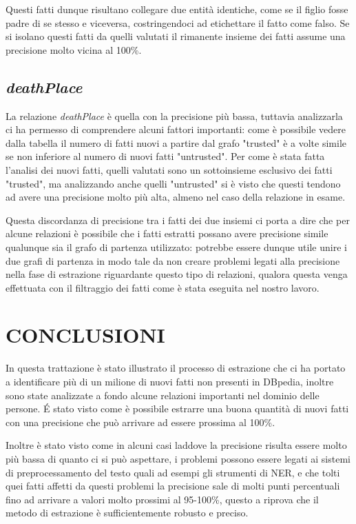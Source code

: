 \documentclass[10pt,a4paper,twocolumn]{article}
\begin{document}
Questi fatti dunque risultano collegare due entità identiche, come se il figlio fosse padre di se stesso e viceversa, costringendoci ad etichettare il fatto come falso. Se si isolano questi fatti da quelli valutati il rimanente insieme dei fatti assume una precisione molto vicina al 100\%.

\subsection{\textit{deathPlace}} \label{deathPlace}

La relazione \textit{deathPlace} è quella con la precisione più bassa, tuttavia analizzarla ci ha permesso di comprendere alcuni fattori importanti: come è possibile vedere dalla tabella il numero di fatti nuovi a partire dal grafo "trusted" è a volte simile se non inferiore al numero di nuovi fatti "untrusted". Per come è stata fatta l'analisi dei nuovi fatti, quelli valutati sono un sottoinsieme esclusivo dei fatti "trusted", ma analizzando anche quelli "untrusted" si è visto che questi tendono ad avere una precisione molto più alta, almeno nel caso della relazione in esame.

Questa discordanza di precisione tra i fatti dei due insiemi ci porta a dire che per alcune relazioni è possibile che i fatti estratti possano avere precisione simile qualunque sia il grafo di partenza utilizzato: potrebbe essere dunque utile unire i due grafi di partenza in modo tale da non creare problemi legati alla precisione nella fase di estrazione riguardante questo tipo di relazioni, qualora questa venga effettuata con il filtraggio dei fatti come è stata eseguita nel nostro lavoro.

\section{CONCLUSIONI}

In questa trattazione è stato illustrato il processo di estrazione che ci ha portato a identificare più di un milione di nuovi fatti non presenti in DBpedia, inoltre sono state analizzate a fondo alcune relazioni importanti nel dominio delle persone. \'E stato visto come è possibile estrarre una buona quantità di nuovi fatti con una precisione che può arrivare ad essere prossima al 100\%. 

Inoltre è stato visto come in alcuni casi laddove la precisione risulta essere molto più bassa di quanto ci si può aspettare, i problemi possono essere legati ai sistemi di preprocessamento del testo quali ad esempi gli strumenti di NER, e che tolti quei fatti affetti da questi problemi la precisione sale di molti punti percentuali fino ad arrivare a valori molto prossimi al 95-100\%, questo a riprova che il metodo di estrazione è sufficientemente robusto e preciso.
\end{document}
